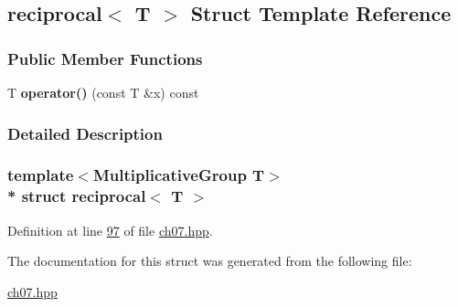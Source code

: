 \hypertarget{structreciprocal}{}\subsection{reciprocal$<$ T $>$ Struct Template Reference}
\label{structreciprocal}
\subsubsection*{Public Member Functions}
\begin{DoxyCompactItemize}
\item 
T {\bfseries operator()} (const T \&x) const \hypertarget{structreciprocal_a984600079a290695173da3650f0d4f50}{}\label{structreciprocal_a984600079a290695173da3650f0d4f50}

\end{DoxyCompactItemize}


\subsubsection{Detailed Description}
\subsubsection*{template$<$Multiplicative\+Group T$>$\\*
struct reciprocal$<$ T $>$}



Definition at line \hyperlink{ch07_8hpp_source_l00097}{97} of file \hyperlink{ch07_8hpp_source}{ch07.\+hpp}.



The documentation for this struct was generated from the following file\+:\begin{DoxyCompactItemize}
\item 
\hyperlink{ch07_8hpp}{ch07.\+hpp}\end{DoxyCompactItemize}
